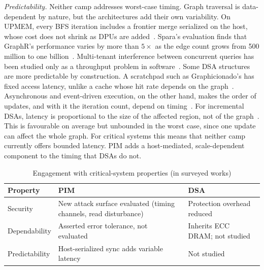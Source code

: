 \documentclass[journal,onecolumn]{IEEEtran}
\begin{document}
\emph{Predictability.} Neither camp addresses worst-case timing. Graph traversal is data-dependent by nature, but the architectures add their own variability. On UPMEM, every BFS iteration includes a frontier merge serialized on the host, whose cost does not shrink as DPUs are added~\cite{gomezluna2022prim}. Spara's evaluation finds that GraphR's performance varies by more than $5\times$ as the edge count grows from 500 million to one billion~\cite{zheng2020spara}. Multi-tenant interference between concurrent queries has been studied only as a throughput problem in software~\cite{yin2023glign}. Some DSA structures are more predictable by construction. A scratchpad such as Graphicionado's has fixed access latency, unlike a cache whose hit rate depends on the graph~\cite{ham2016graphicionado}. Asynchronous and event-driven execution, on the other hand, makes the order of updates, and with it the iteration count, depend on timing~\cite{rahman2021jetstream,zhuo2019graphq}. For incremental DSAs, latency is proportional to the size of the affected region, not of the graph~\cite{rahman2021jetstream,zhao2022tdgraph}. This is favourable on average but unbounded in the worst case, since one update can affect the whole graph. For critical systems this means that neither camp currently offers bounded latency. PIM adds a host-mediated, scale-dependent component to the timing that DSAs do not.

\begin{table}[t]
\caption{Engagement with critical-system properties (in surveyed works)}
\label{tab:critical}
\centering\scriptsize
\begin{tabularx}{\columnwidth}{@{}L{1.4cm}YY@{}}
\toprule
Property & PIM & DSA \\
\midrule
Security & New attack surface evaluated (timing channels, read disturbance)~\cite{bostanci2025impact,yuksel2026pid} & Protection overhead reduced~\cite{hua2022mgx} \\
Dependability & Asserted error tolerance, not evaluated~\cite{song2018graphr} & Inherits ECC DRAM; not studied \\
Predictability & Host-serialized sync adds variable latency~\cite{gomezluna2022prim} & Not studied \\
\bottomrule
\end{tabularx}
\end{table}

\end{document}
